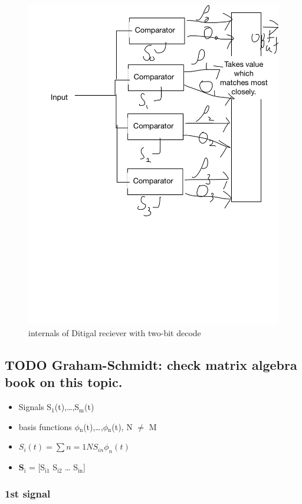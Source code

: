 \documentclass[11pt]{article}
\begin{document}
\begin{figure}[htb]
\centering
\includegraphics[width=.9\linewidth]{./img/Digital_reciever.png}
\caption{internals of Ditigal reciever with two-bit decode}
\end{figure}

\subsection{{\bfseries\sffamily TODO} Graham-Schmidt: check matrix algebra book on this topic.}
\label{sec-4-3}


\begin{itemize}
\item Signals S$_{\text{1}}$(t),\ldots{},S$_{\text{m}}$(t)
\item basis functions $\phi$$_{\text{n}}$(t),\ldots{},$\phi$$_{\text{n}}$(t), N $\neq$ M
\item \(S_i(t) = \sum{n=1}{N}{S_{in} \phi_n(t)}\)
\item \textbf{S$_{\text{i}}$} = [S$_{\text{i1}}$ S$_{\text{i2}}$ \ldots{} S$_{\text{in}}$]
\end{itemize}

\subsubsection{1st signal}
\label{sec-4-3-1}
\end{document}
